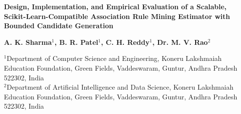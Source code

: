 \documentclass[11pt,a4paper]{article}
\begin{document}
\begin{center}
    {\LARGE \textbf{Design, Implementation, and Empirical Evaluation of a Scalable, Scikit-Learn-Compatible Association Rule Mining Estimator with Bounded Candidate Generation}}
    \vspace{0.7em}
    
    {\large \textbf{A. K. Sharma$^1$, B. R. Patel$^1$, C. H. Reddy$^1$, Dr. M. V. Rao$^2$}}
    \vspace{0.4em}
    
    {\small
    $^1$Department of Computer Science and Engineering, Koneru Lakshmaiah Education Foundation, Green Fields, Vaddeswaram, Guntur, Andhra Pradesh 522302, India\\
    $^2$Department of Artificial Intelligence and Data Science, Koneru Lakshmaiah Education Foundation, Green Fields, Vaddeswaram, Guntur, Andhra Pradesh 522302, India
    }
\end{center}

\vspace{0.4em}
\end{document}
